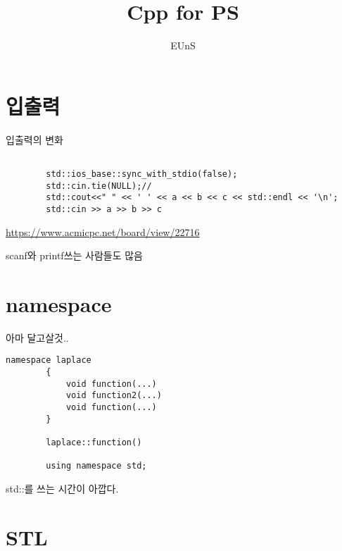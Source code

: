 \documentclass[10pt]{beamer}
\title{Cpp for PS}
\author{EUnS}
\begin{document}
\begin{frame}
  \maketitle
\end{frame}


\begin{frame}
	\tableofcontents
\end{frame}
\section{입출력}
\begin{frame}[fragile]{입출력의 변화}
    \begin{lstlisting}[style = CStyle]
    
        std::ios_base::sync_with_stdio(false); 
        std::cin.tie(NULL);//
        std::cout<<" " << ' ' << a << b << c << std::endl << '\n';
        std::cin >> a >> b >> c 
    \end{lstlisting}
    \url{https://www.acmicpc.net/board/view/22716}

    scanf와 printf쓰는 사람들도 많음
\end{frame}

\section{namespace}

\begin{frame}[fragile]{아마 달고살것..}
    \begin{lstlisting}[style = CStyle]
        namespace laplace
        {
            void function(...)
            void function2(...)
            void function(...)
        }

        laplace::function()

        using namespace std;
    \end{lstlisting}
    std::를 쓰는 시간이 아깝다.        
\end{frame}

\section{STL}
\end{document}
